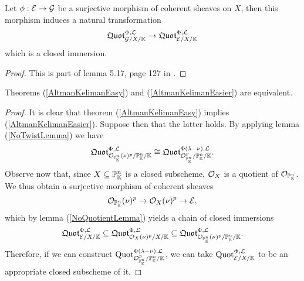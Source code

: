 \begin{lemma}\label{NoQuotientLemma}
Let $\phi:\mathcal{E}\to\mathcal{G}$ be a surjective morphism of coherent sheaves on $X$, then this morphism induces a natural transformation \[\mathfrak{Quot}^{\Phi,\mathcal{L}}_{\mathcal{G}/X/\mathbb{K}}\to \mathfrak{Quot}^{\Phi,\mathcal{L}}_{\mathcal{E}/X/\mathbb{K}}\]
which is a closed immersion.
\end{lemma}
\begin{proof}
This is part of lemma 5.17, page 127 in \cite{FGAEXPLAINED}.
\end{proof}





\begin{proposition}
Theorems (\ref{AltmanKelimanEasy}) and (\ref{AltmanKelimanEasier}) are equivalent.
\end{proposition}
\begin{proof}
It is clear that theorem (\ref{AltmanKelimanEasy}) implies (\ref{AltmanKelimanEasier}). Suppose then that the latter holds. 
By applying lemma (\ref{NoTwistLemma}) we have
\[\mathfrak{Quot}^{\Phi,\mathcal{L}}_{\mathcal{O}_{\mathbb{P}^n_{\mathbb{K}}}(\nu)^p/\mathbb{P}^n_{\mathbb{K}}/\mathbb{K}}\cong \mathfrak{Quot}^{\Phi(\lambda-\nu),\mathcal{L}}_{\mathcal{O}_{\mathbb{P}^n_{\mathbb{K}}}^p/\mathbb{P}^n_{\mathbb{K}}/\mathbb{K}}.\]
Observe now that, since $X\subseteq \mathbb{P}^n_{\mathbb{K}}$ is a closed subscheme, $\mathcal{O}_X$ is a quotient of $\mathcal{O}_{\mathbb{P}^n_{\mathbb{K}}}$. We thus obtain a surjective morphism of coherent sheaves
\[\mathcal{O}_{\mathbb{P}^n_{\mathbb{K}}}(\nu)^p\to \mathcal{O}_X(\nu)^p\to \mathcal{E},\]
which by lemma (\ref{NoQuotientLemma}) yields a chain of closed immersions
\[\mathfrak{Quot}^{\Phi,\mathcal{L}}_{\mathcal{E}/X/\mathbb{K}}\subseteq \mathfrak{Quot}^{\Phi,\mathcal{L}}_{\mathcal{O}_X(\nu)^p/X/\mathbb{K}}\subseteq\mathfrak{Quot}^{\Phi,\mathcal{L}}_{\mathcal{O}_{\mathbb{P}^n_{\mathbb{K}}}(\nu)^p/\mathbb{P}^n_{\mathbb{K}}/\mathbb{K}}.\]
Therefore, if we can construct $\mathrm{Quot}^{\Phi(\lambda-\nu),\mathcal{L}}_{\mathcal{O}^p_{\mathbb{P}^n_{\mathbb{K}}}/\mathbb{P}^n_{\mathbb{K}}/\mathbb{K}}$, we can take $\mathrm{Quot}^{\Phi,\mathcal{L}}_{\mathcal{E}/X/\mathbb{K}}$ to be an appropriate closed subscheme of it.
\end{proof}

